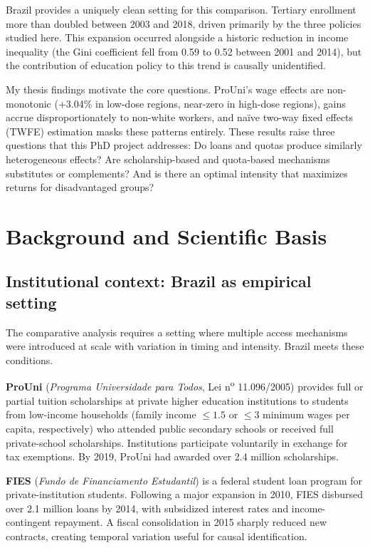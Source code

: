 \documentclass[a4paper,11pt]{article}
\begin{document}
Brazil provides a uniquely clean setting for this comparison. Tertiary enrollment more than doubled between 2003 and 2018, driven primarily by the three policies studied here. This expansion occurred alongside a historic reduction in income inequality (the Gini coefficient fell from 0.59 to 0.52 between 2001 and 2014), but the contribution of education policy to this trend is causally unidentified.

My thesis findings motivate the core questions. ProUni's wage effects are non-monotonic (+3.04\% in low-dose regions, near-zero in high-dose regions), gains accrue disproportionately to non-white workers, and na\"ive two-way fixed effects (TWFE) estimation masks these patterns entirely. These results raise three questions that this PhD project addresses: Do loans and quotas produce similarly heterogeneous effects? Are scholarship-based and quota-based mechanisms substitutes or complements? And is there an optimal intensity that maximizes returns for disadvantaged groups?

\section{Background and Scientific Basis}

\subsection{Institutional context: Brazil as empirical setting}

The comparative analysis requires a setting where multiple access mechanisms were introduced at scale with variation in timing and intensity. Brazil meets these conditions.

\textbf{ProUni} (\textit{Programa Universidade para Todos}, Lei n\textsuperscript{o} 11.096/2005) provides full or partial tuition scholarships at private higher education institutions to students from low-income households (family income $\leq 1.5$ or $\leq 3$ minimum wages per capita, respectively) who attended public secondary schools or received full private-school scholarships. Institutions participate voluntarily in exchange for tax exemptions. By 2019, ProUni had awarded over 2.4 million scholarships.

\textbf{FIES} (\textit{Fundo de Financiamento Estudantil}) is a federal student loan program for private-institution students. Following a major expansion in 2010, FIES disbursed over 2.1 million loans by 2014, with subsidized interest rates and income-contingent repayment. A fiscal consolidation in 2015 sharply reduced new contracts, creating temporal variation useful for causal identification.
\end{document}
